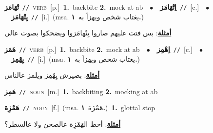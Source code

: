 \documentclass[10pt,a4paper,twoside]{article} %
\begin{document}
\begin{multicols}{2}
{\setlength\topsep{0pt}\textbf{\foreignlanguage{arabic}{تْهَامَز}}\ {\color{gray}\texttt{//}\color{black}}\ \textsc{verb}\ [p.]\ \textbf{1.}~backbite  \textbf{2.}~mock at ab\ \ $\bullet$\ \ \setlength\topsep{0pt}\textbf{\foreignlanguage{arabic}{اِتْهَامَز}}\ {\color{gray}\texttt{//}\color{black}}\ [c.]\ \ $\bullet$\ \ \setlength\topsep{0pt}\textbf{\foreignlanguage{arabic}{يِتْهَامَز}}\ {\color{gray}\texttt{//}\color{black}}\ [i.]\ \color{gray}(msa. \foreignlanguage{arabic}{يغتاب شخص ويهزأ به}~\foreignlanguage{arabic}{\textbf{١.}})\color{black}\  \begin{flushright}\color{gray}\foreignlanguage{arabic}{\textbf{\underline{\foreignlanguage{arabic}{أمثلة}}}: بس فتت عليهم صاروا يِتْهامَزوا ويضحكوا بصوت عالي}\end{flushright}\color{black}} \vspace{2mm}

{\setlength\topsep{0pt}\textbf{\foreignlanguage{arabic}{هَمَز}}\ {\color{gray}\texttt{//}\color{black}}\ \textsc{verb}\ [p.]\ \textbf{1.}~backbite  \textbf{2.}~mock at ab\ \ $\bullet$\ \ \setlength\topsep{0pt}\textbf{\foreignlanguage{arabic}{اِهْمِز}}\ {\color{gray}\texttt{//}\color{black}}\ [c.]\ \ $\bullet$\ \ \setlength\topsep{0pt}\textbf{\foreignlanguage{arabic}{يِهْمِز}}\ {\color{gray}\texttt{//}\color{black}}\ [i.]\ \color{gray}(msa. \foreignlanguage{arabic}{يغتاب شخص ويهزأ به}~\foreignlanguage{arabic}{\textbf{١.}})\color{black}\  \begin{flushright}\color{gray}\foreignlanguage{arabic}{\textbf{\underline{\foreignlanguage{arabic}{أمثلة}}}: بصيرش يِهْمِز ويلمز عالناس}\end{flushright}\color{black}} \vspace{2mm}

{\setlength\topsep{0pt}\textbf{\foreignlanguage{arabic}{هَمِز}}\ {\color{gray}\texttt{//}\color{black}}\ \textsc{noun}\ [m.]\ \textbf{1.}~backbiting  \textbf{2.}~mocking at ab\ } \vspace{2mm}

{\setlength\topsep{0pt}\textbf{\foreignlanguage{arabic}{هَمْزِة}}\ {\color{gray}\texttt{//}\color{black}}\ \textsc{noun}\ [f.]\ \color{gray}(msa. \foreignlanguage{arabic}{هَمْزَة}~\foreignlanguage{arabic}{\textbf{١.}})\color{black}\ \textbf{1.}~glottal stop\  \begin{flushright}\color{gray}\foreignlanguage{arabic}{\textbf{\underline{\foreignlanguage{arabic}{أمثلة}}}: أحط الهَمْزِة عالصحن ولا عالسطر؟}\end{flushright}\color{black}} \vspace{2mm}


\end{multicols}
\end{document}
